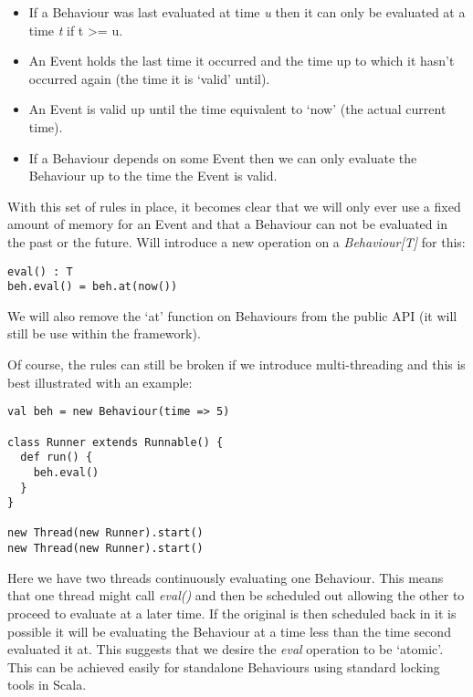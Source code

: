 \documentclass[12pt]{article}
\begin{document}
        \begin{itemize}
          \item If a Behaviour was last evaluated at time \emph{u} then it can only be evaluated at
          a time \emph{t} if t >= u.
          \item An Event holds the last time it occurred and the time up to which it hasn't occurred
          again (the time it is `valid' until).
          \item An Event is valid up until the time equivalent to `now' (the actual current time).
          \item If a Behaviour depends on some Event then we can only evaluate the Behaviour up to
          the time the Event is valid.
        \end{itemize}
        
        With this set of rules in place, it becomes clear that we will only ever use a fixed amount of memory
        for an Event and that a Behaviour can not be evaluated in the past or the future. Will
        introduce a new operation on a \emph{Behaviour[T]} for this:

\begin{verbatim}
eval() : T
beh.eval() = beh.at(now())
\end{verbatim}       

        We will also remove the `at' function on Behaviours from the public API (it will still be
        use within the framework). 
        
        Of course, the rules can still be broken if we introduce multi-threading and this is best illustrated
        with an example:
        
\begin{verbatim}
val beh = new Behaviour(time => 5)

class Runner extends Runnable() {
  def run() {
    beh.eval()
  }
}

new Thread(new Runner).start()
new Thread(new Runner).start()
\end{verbatim}       

        Here we have two threads continuously evaluating one Behaviour. This means that one thread
        might call \emph{eval()} and then be scheduled out allowing the other to proceed to evaluate
        at a later time. If the original is then scheduled back in it is possible it will
        be evaluating the Behaviour at a time less than the time second evaluated it at. This suggests
        that we desire the \emph{eval} operation to be `atomic'. This can be achieved easily for standalone
        Behaviours using standard locking tools in Scala.
        
\end{document}
